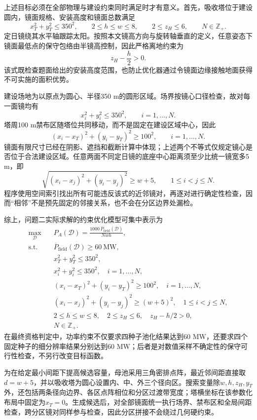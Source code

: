 上述目标必须在全部物理与建设约束同时满足时才有意义。首先，吸收塔位于建设圆内，镜面规格、安装高度和镜面总数满足
\[
 x_T^2+y_T^2\le350^2,\qquad
 2\le h\le w\le 8,\qquad 2\le z_H\le 6,
 \qquad N\in\mathbb Z_{+}.
\]
定日镜绕其水平轴跟踪太阳。按照本文镜高方向与旋转轴垂直的定义，任意姿态下镜面最低点的保守包络由半镜高控制，因此严格离地约束为
\[
 z_H-\frac{h}{2}>0.
\]
该式既检查题面给出的安装高度范围，也防止优化器通过令镜面边缘接触地面获得不可实施的面积优势。

建设场地为以原点为圆心、半径350 m的圆形区域。场界按镜心口径检查，故对每一面镜均有
\[
 x_i^2+y_i^2\le350^2,\qquad i=1,\ldots,N.
\]
塔周100 m禁布区随塔位共同移动，而不是固定在建设区域中心，因此
\[
 (x_i-x_T)^2+(y_i-y_T)^2\ge100^2,
 \qquad i=1,\ldots,N.
\]
镜面有限尺寸已经在阴影、遮挡和截断计算中体现；上述两个不等式仅规定镜心是否位于合法建设区域。任意两面不同定日镜的底座中心距离须至少比统一镜宽多5 m，即
\[
 \sqrt{(x_i-x_j)^2+(y_i-y_j)^2}\ge w+5,
 \qquad 1\le i<j\le N.
\]
程序使用空间索引找出所有可能违反该式的近邻镜对，再逐对进行确定性检查，因而“相邻”不是预先固定的邻接关系，也不会在分区边界处漏检。

综上，问题二实际求解的约束优化模型可集中表示为
\[
\begin{aligned}
 \max_{\mathcal D}\quad
 &P_A(\mathcal D)=\frac{1000\,\overline P_{\mathrm{field}}(\mathcal D)}{Nwh},\\
 \mathrm{s.t.}\quad
 &\overline P_{\mathrm{field}}(\mathcal D)\ge60\ \mathrm{MW},\\
 &x_T^2+y_T^2\le350^2,\\
 &x_i^2+y_i^2\le350^2,\quad i=1,\ldots,N,\\
 &(x_i-x_T)^2+(y_i-y_T)^2\ge100^2,\quad i=1,\ldots,N,\\
 &(x_i-x_j)^2+(y_i-y_j)^2\ge(w+5)^2,
   \quad 1\le i<j\le N,\\
 &2\le h\le w\le8,\quad 2\le z_H\le6,\quad z_H-h/2>0,\\
 &N\in\mathbb Z_{+}.
\end{aligned}
\]
在最终资格判定中，功率约束不仅要求四种子池化结果达到60 MW，还要求四个固定种子的细分辨率结果分别达到60 MW；后者是对数值采样不确定性的保守可行性检查，不另行改变目标函数。

为在给定最小间距下提高候选容量，母池采用三角密排点阵，最近邻间距直接取$d=w+5$，并以吸收塔为圆心设置内、中、外三个径向区。搜索变量除$w,h,z_H,y_T$外，还包括两条径向边界、各区点阵相位和分区过渡带宽度；塔横坐标在该参数化布局中固定为$x_T=0$。生成候选后，对全部镜面统一执行场界、禁布区和全局间距检查，跨分区镜对同样参与检查，因此分区拼接不会绕过几何硬约束。

